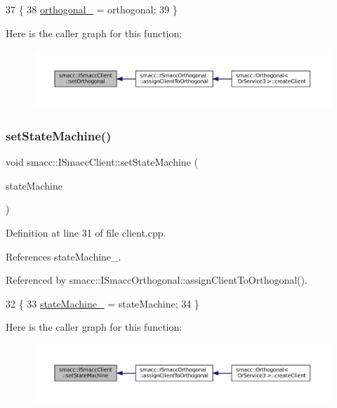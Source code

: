 \begin{DoxyCode}
37 \{
38     \hyperlink{classsmacc_1_1ISmaccClient_a571c7f672d9c90128b5498aefc27c136}{orthogonal\_} = orthogonal;
39 \}
\end{DoxyCode}
Here is the caller graph for this function\+:
\nopagebreak
\begin{figure}[H]
\begin{center}
\leavevmode
\includegraphics[width=350pt]{classsmacc_1_1ISmaccClient_a40330788a976dc08e2f726d210564ec4_icgraph}
\end{center}
\end{figure}
\mbox{\label{classsmacc_1_1ISmaccClient_a28fd6ca2bcf9c5e57f3cc16fb0a076d3}} 
\subsubsection{\texorpdfstring{set\+State\+Machine()}{setStateMachine()}}
{\footnotesize\ttfamily void smacc\+::\+I\+Smacc\+Client\+::set\+State\+Machine (\begin{DoxyParamCaption}\item[{\hyperlink{classsmacc_1_1ISmaccStateMachine}{I\+Smacc\+State\+Machine} $\ast$}]{state\+Machine }\end{DoxyParamCaption})\hspace{0.3cm}{\ttfamily [protected]}}



Definition at line 31 of file client.\+cpp.



References state\+Machine\+\_\+.



Referenced by smacc\+::\+I\+Smacc\+Orthogonal\+::assign\+Client\+To\+Orthogonal().


\begin{DoxyCode}
32 \{
33     \hyperlink{classsmacc_1_1ISmaccClient_a926e4f2ae796def63d48dca389a48c47}{stateMachine\_} = stateMachine;
34 \}
\end{DoxyCode}
Here is the caller graph for this function\+:
\nopagebreak
\begin{figure}[H]
\begin{center}
\leavevmode
\includegraphics[width=350pt]{classsmacc_1_1ISmaccClient_a28fd6ca2bcf9c5e57f3cc16fb0a076d3_icgraph}
\end{center}
\end{figure}


